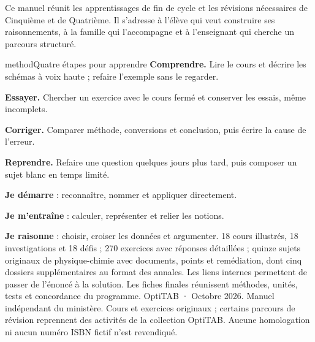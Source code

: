 \pagestyle{otFront}
Ce manuel réunit les apprentissages de fin de cycle et les révisions nécessaires de Cinquième et de Quatrième. Il s’adresse à l’élève qui veut construire ses raisonnements, à la famille qui l’accompagne et à l’enseignant qui cherche un parcours structuré.
\begin{pcEncadre}{method}{Quatre étapes pour apprendre}
\textbf{Comprendre.} Lire le cours et décrire les schémas à voix haute ; refaire l’exemple sans le regarder.\par
\textbf{Essayer.} Chercher un exercice avec le cours fermé et conserver les essais, même incomplets.\par
\textbf{Corriger.} Comparer méthode, conversions et conclusion, puis écrire la cause de l’erreur.\par
\textbf{Reprendre.} Refaire une question quelques jours plus tard, puis composer un sujet blanc en temps limité.
\end{pcEncadre}
\quad\textbf{Je démarre} : reconnaître, nommer et appliquer directement.\par
{}\quad\textbf{Je m’entraîne} : calculer, représenter et relier les notions.\par
{}\quad\textbf{Je raisonne} : choisir, croiser les données et argumenter.
18 cours illustrés, 18 investigations et 18 défis ; 270 exercices avec réponses détaillées ; quinze sujets originaux de physique-chimie avec documents, points et remédiation, dont cinq dossiers supplémentaires au format des annales. Les liens internes permettent de passer de l’énoncé à la solution. Les fiches finales réunissent méthodes, unités, tests et concordance du programme.
\vfill
{\small OptiTAB · Octobre 2026. Manuel indépendant du ministère. Cours et exercices originaux ; certains parcours de révision reprennent des activités de la collection OptiTAB. Aucune homologation ni aucun numéro ISBN fictif n’est revendiqué.}
\clearpage{}
\begingroup\setlength{\parskip}{0pt}
